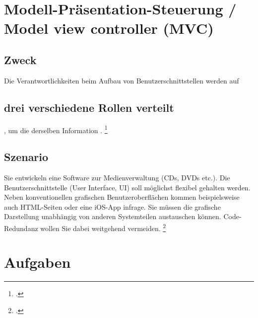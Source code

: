 \documentclass{lehramt-informatik-haupt}
\begin{document}

\chapter{Modell-Präsentation-Steuerung / Model view controller (MVC)}

\begin{quellen}
\item \cite{wiki:mvc}
\item \cite[Kapitel „Observer“, Seite 256]{gof}
\item \cite[Kapitel 5.6, Seite 92-95]{eilebrecht}
\item \cite[Kapitel 3.8, Seite 48-49]{siebler}
\end{quellen}

%

\section{Zweck}

Die Verantwortlichkeiten beim Aufbau von Benutzerschnittstellen werden
auf \section{drei verschiedene Rollen verteilt}, um die
 derselben Information .
\footcite[Seite 92]{eilebrecht}

%

\section{Szenario}

Sie entwickeln eine Software zur Medienverwaltung (CDs, DVDs etc.). Die
Benutzerschnittstelle (User Interface, UI) soll möglichst flexibel
gehalten werden. Neben konventionellen grafischen Benutzeroberflächen
kommen beispielsweise auch HTML-Seiten oder eine iOS-App infrage. Sie
müssen die grafische Darstellung unabhängig von anderen Systemteilen
austauschen können. Code-Redundanz wollen Sie dabei weitgehend
vermeiden.
\footcite[Seite 92]{eilebrecht}


\chapter{Aufgaben}

\literatur
\end{document}
